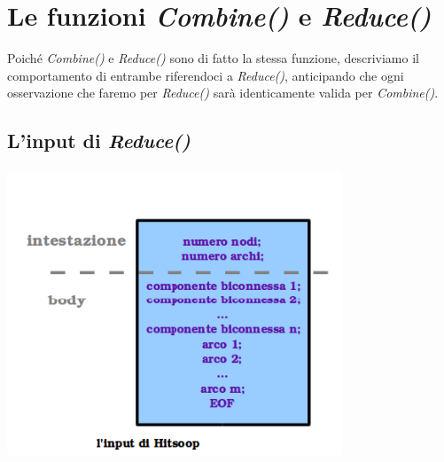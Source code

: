 \documentclass[a4paper,11pt]{report}
\begin{document}
\section{Le funzioni \emph{Combine()} e \emph{Reduce()}}
Poiché \emph{Combine()} e \emph{Reduce()} sono di fatto la stessa funzione, descriviamo il comportamento di entrambe riferendoci a
\emph{Reduce()}, anticipando che ogni osservazione 
che faremo per \emph{Reduce()} sarà identicamente valida per \emph{Combine()}.
\subsection{L'input di \emph{Reduce()}}\label{L'input di Reduce()}
\paragraph{}
\centerline{\includegraphics[width=100mm]{images/input-hitsoop.png}}
\end{document}
